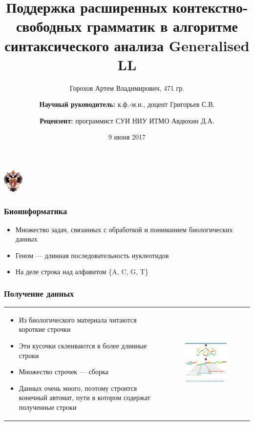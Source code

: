 \documentclass{beamer}
\title[]{Поддержка расширенных контекстно-свободных грамматик в алгоритме синтаксического анализа Generalised LL}
\institute[СПбГУ]{ Санкт-Петербургский Государственный Университет }
\author[Горохов Артем]{Горохов Артем Владимирович, 471 гр. \\
    \and  
    {\bfseries Научный руководитель:} к.ф.-м.н., доцент Григорьев С.В. \\ 
    \and  
    {\bfseries Рецензент:} \small{программист СУИ НИУ ИТМО } Авдюхин Д.А. \\ 
}
\date{9 июня 2017}
\begin{document}
 

\begin{frame}
	\begin{center} 
		{\includegraphics[width=1cm]{pictures/SPbGU_Logo.png}} 
	\end{center}
	\titlepage
\end{frame}



\begin{frame}
     \frametitle{Биоинформатика}
     \begin{itemize}
         \item Множество задач, связанных с обработкой и пониманием биологических данных
         
         \item Геном --- длинная последовательность нуклеотидов
         \item На деле строка над алфавитом \{A, C, G, T\}
     \end{itemize}
 \end{frame}
 
 \begin{frame}
     \frametitle{Получение данных}
     \begin{tabular}{p{5cm} p{7cm}}
         \begin{itemize}
             \item Из биологического материала читаются короткие строчки
             \item Эти кусочки склеиваются в более длинные строки
             \item Множество строчек --- сборка
             \item Данных очень много, поэтому строится конечный автомат, пути в котором содержат полученные строки
         \end{itemize}
         &
         \begin{figure}[b]
             \centering
             \includegraphics[width=6.5cm]{pictures/readsAssembly.png}  
         \end{figure}
     \end{tabular}
 \end{frame}
 
\end{document}
